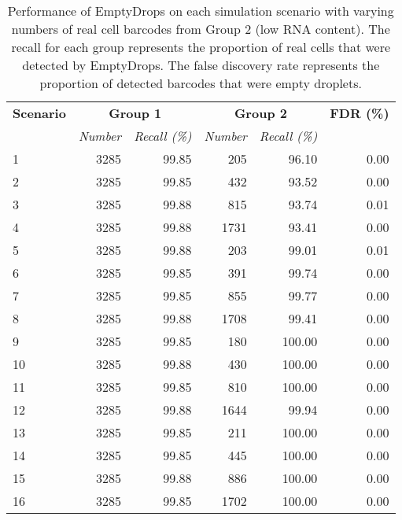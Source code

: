 \documentclass[10pt,letterpaper]{article}
\begin{document}
\begin{table}[bt]
    \caption{Performance of EmptyDrops on each simulation scenario with varying numbers of real cell barcodes from Group 2 (low RNA content).
        The recall for each group represents the proportion of real cells that were detected by EmptyDrops.
        The false discovery rate represents the proportion of detected barcodes that were empty droplets.
    }
    \begin{center}
        \begin{tabular}{l r r r r r}
            \hline
            \textbf{Scenario} & \multicolumn{2}{c}{\textbf{Group 1}} & \multicolumn{2}{c}{\textbf{Group 2}} & \multicolumn{1}{c}{\textbf{FDR (\%)}} \\
            & \textit{Number} & \textit{Recall (\%)} &  \textit{Number} & \textit{Recall (\%)} & \\
            \hline
            1  & 3285 & 99.85 &  205 &  96.10 & 0.00 \\ 
            2  & 3285 & 99.85 &  432 &  93.52 & 0.00 \\
            3  & 3285 & 99.88 &  815 &  93.74 & 0.01 \\
            4  & 3285 & 99.88 & 1731 &  93.41 & 0.00 \\
            5  & 3285 & 99.88 &  203 &  99.01 & 0.01 \\
            6  & 3285 & 99.85 &  391 &  99.74 & 0.00 \\
            7  & 3285 & 99.85 &  855 &  99.77 & 0.00 \\
            8  & 3285 & 99.88 & 1708 &  99.41 & 0.00 \\
            9  & 3285 & 99.85 &  180 & 100.00 & 0.00 \\
            10 & 3285 & 99.88 &  430 & 100.00 & 0.00 \\
            11 & 3285 & 99.85 &  810 & 100.00 & 0.00 \\
            12 & 3285 & 99.88 & 1644 &  99.94 & 0.00 \\
            13 & 3285 & 99.85 &  211 & 100.00 & 0.00 \\
            14 & 3285 & 99.85 &  445 & 100.00 & 0.00 \\
            15 & 3285 & 99.88 &  886 & 100.00 & 0.00 \\
            16 & 3285 & 99.85 & 1702 & 100.00 & 0.00 \\
            \hline
        \end{tabular}
    \end{center}
    \label{tab:sim}
\end{table}
\end{document}
